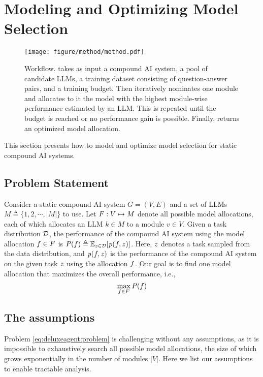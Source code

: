 \section{Modeling and Optimizing Model Selection}\label{sec:deluxeagent:Method}

\begin{figure*}[!ht]
    \centering
    \texttt{[image: figure/method/method.pdf]}
    \caption{\deluxesystem{} Workflow. \deluxesystem{} takes as input a compound AI system, a pool of candidate LLMs, a training dataset consisting of question-answer pairs, and a training budget. Then \deluxesystem{} iteratively nominates one module and allocates to it the model with the highest module-wise performance estimated by an LLM. This is repeated until the budget is reached or no performance gain is possible. Finally, \deluxesystem{} returns an optimized model allocation. }
    \label{fig:deluxeagent:method}
\end{figure*}
This section presents how to model and optimize model selection for static compound AI systems. 

\subsection{Problem Statement}
Consider a static compound AI system $G=(V,E)$ and a set of LLMs  $M\triangleq \{1,2,\cdots, |M|\}$ to use. Let $F:V \mapsto  M$ denote all possible model allocations, each of which allocates an LLM $k \in M$ to a module $v\in V$. Given a task distribution $\mathcal{D}$, the performance of the compound AI system using the model allocation $f \in F$ is $\mathit{P}(f) \triangleq \mathbb{E}_{z \in \mathcal{D}} [ \mathit{p} (f,z)]$. Here, $z$ denotes a task sampled from the data distribution, and $\mathit{p} (f,z)$ is the performance of the compound AI system on the given task $z$ using the allocation $f$. Our goal is to find one model allocation that maximizes the overall performance, i.e.,   
\begin{equation}\label{eq:deluxeagent:problem}
\max_{f \in F} \mathit{P}(f)
\end{equation}

\subsection{The assumptions}
Problem \ref{eq:deluxeagent:problem} is challenging without any assumptions, as it is impossible to exhaustively search all possible model allocations, the size of which grows exponentially in the number of modules $|V|$. Here we list our assumptions to enable tractable analysis.

